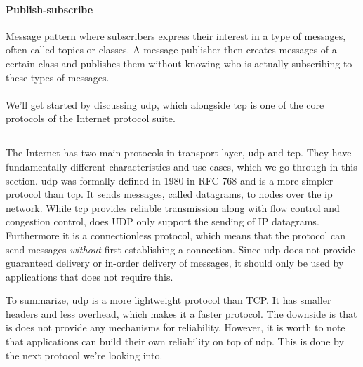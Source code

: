\paragraph{Publish-subscribe}

Message pattern where subscribers express their interest in a type of messages,
often called topics or classes. A message publisher then creates messages of a
certain class and publishes them without knowing who is actually subscribing to
these types of messages.

\paragraph{}
We'll get started by discussing \gls{udp}, which
alongside \gls{tcp} is one of the core protocols of the Internet protocol suite.


\subsection{}

The Internet has two main protocols in transport layer, \gls{udp} and \gls{tcp}.
They have fundamentally different characteristics and use cases, which we go
through in this section. \gls{udp} was formally defined in 1980 in RFC
768\cite{rfc-udp} and is a more simpler protocol than \gls{tcp}. It sends
messages, called datagrams, to nodes over the \gls{ip} network. While \gls{tcp}
provides reliable transmission along with flow control and congestion control,
does UDP only support the sending of IP datagrams. Furthermore it is a connectionless
protocol, which means that the protocol can send messages \textit{without} first
establishing a connection. Since \gls{udp} does not provide guaranteed delivery
or in-order delivery of messages, it should only be used by applications that
does not require this.

To summarize, \gls{udp} is a more lightweight protocol than TCP. It has smaller
headers and less overhead, which makes it a faster protocol. The downside is that
is does not provide any mechanisms for reliability. However, it is worth to note
that applications can build their own reliability on top of \gls{udp}. This is
done by the next protocol we're looking into.

\subsection{}

